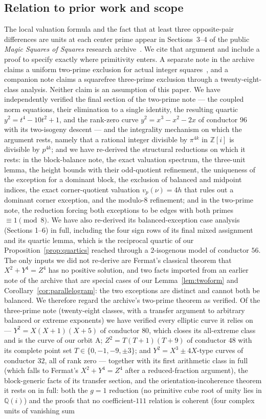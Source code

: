 \documentclass[11pt,letterpaper]{article}
\theoremstyle{definition}\newtheorem{definition}[theorem]{Definition}
\theoremstyle{remark}\newtheorem{remark}[theorem]{Remark}
\newcommand{\Q}{\mathbb Q}\newcommand{\Z}{\mathbb Z}\newcommand{\R}{\mathbb R}
\begin{document}
\subsection{Relation to prior work and scope}\label{sec:prior}
The local valuation formula and the fact that at least three opposite-pair differences are units at each center prime appear in Sections~3--4 of the public \emph{Magic Squares of Squares} research archive~\cite{MSSArchive}. We cite that argument and include a proof to specify exactly where primitivity enters. A separate note in the archive claims a uniform two-prime exclusion for actual integer squares~\cite{MSSTwoBlock}, and a companion note claims a squarefree three-prime exclusion through a twenty-eight-class analysis. Neither claim is an assumption of this paper. We have independently verified the final section of the two-prime note — the coupled norm equations, their elimination to a single identity, the resulting quartic $y^2=t^4-10t^2+1$, and the rank-zero curve $y^2=x^3-x^2-2x$ of conductor $96$ with its two-isogeny descent — and the integrality mechanism on which the argument rests, namely that a rational integer divisible by $\pi^{4k}$ in $\Z[i]$ is divisible by $p^{4k}$; and we have re-derived the structural reductions on which it rests: in the block-balance note, the exact valuation spectrum, the three-unit lemma, the height bounds with their odd-quotient refinement, the uniqueness of the exception for a dominant block, the exclusion of balanced and midpoint indices, the exact corner-quotient valuation $v_p(\nu)=4h$ that rules out a dominant corner exception, and the modulo-$8$ refinement; and in the two-prime note, the reduction forcing both exceptions to be edges with both primes $\equiv1\pmod8$. We have also re-derived its balanced-exception case analysis (Sections 1--6) in full, including the four sign rows of its final mixed assignment and its quartic lemma, which is the reciprocal quartic of our Proposition~\ref{prop:quartics} reached through a $2$-isogenous model of conductor $56$. The only inputs we did not re-derive are Fermat's classical theorem that $X^2+Y^4=Z^4$ has no positive solution, and two facts imported from an earlier note of the archive that are special cases of our Lemma~\ref{lem:twoform} and Corollary~\ref{cor:parallelogram}: the two exceptions are distinct and cannot both be balanced. We therefore regard the archive's two-prime theorem as verified. Of the three-prime note (twenty-eight classes, with a transfer argument to arbitrary balanced or extreme exponents) we have verified every elliptic curve it relies on — $Y^2=X(X+1)(X+5)$ of conductor $80$, which closes its all-extreme class and is the curve of our orbit A; $Z^2=T(T+1)(T+9)$ of conductor $48$ with its complete point set $T\in\{0,-1,-9,\pm3\}$; and $Y^2=X^3\pm4X$-type curves of conductor $32$, all of rank zero — together with its first arithmetic class in full (which falls to Fermat's $X^2+Y^4=Z^4$ after a reduced-fraction argument), the block-generic facts of its transfer section, and the orientation-incoherence theorem it rests on in full: both the $g=1$ reduction (no primitive cube root of unity lies in $\Q(i)$) and the proofs that no coefficient-$111$ relation is coherent (four complex units of vanishing sum 
\end{document}
